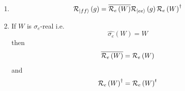 \begin{enumerate}
\begin{enumerate}
\item Bases transformation $W\in GL\left( {\cal H}^{1}\right) $ of ${\cal H}%
^{1}$ produce transformations ${\cal R}_{f}\left( A\right) $ of the
representation ${\cal R}_{e}\left( A\right) $ i.e. 
\begin{equation}
A=\left\vert W\left( \QTR{bs}{e}\right) \right\rangle \left\langle W\left( 
\QTR{bs}{e}\right) \right\vert {\cal R}_{f}\left( A\right) =\left\vert
W\left( \QTR{bs}{e}\right) \right\rangle {\cal R}_{f}\left( A\right)
\left\langle W\left( \QTR{bs}{e}\right) \right\vert =\left\vert \QTR{bs}{e}%
\right\rangle {\cal R}_{e}\left( W\right) {\cal R}_{f}\left( A\right) {\cal R%
}_{e}\left( W\right) ^{\dagger }\left\langle \QTR{bs}{e}\right\vert
\end{equation}%
hence 
\begin{equation}
{\cal R}_{e}\left( A\right) ={\cal R}_{e}\left( W\right) {\cal R}_{f}\left(
A\right) {\cal R}_{e}\left( W\right) ^{\dagger }.
\end{equation}

\item As $W\in GL\left( {\cal H}^{1}\right) $ 
\[
{\cal R}_{f}\left( A\right) ={\cal R}_{e}\left( W\right) ^{-1}{\cal R}%
_{e}\left( A\right) {\cal R}_{e}\left( W\right) ^{-\dagger }. 
\]

\item If $W\in U\left( {\cal H}^{1}\right) $ 
\[
{\cal R}_{f}\left( A\right) ={\cal R}_{e}\left( W\right) ^{\dagger }{\cal R}%
_{e}\left( A\right) {\cal R}_{e}\left( W\right) . 
\]
\end{enumerate}

\item 
\begin{equation}
{\cal R}_{\left\vert ff\right\rangle }\left( g\right) =\overline{{\cal R}%
_{e}\left( W\right) }{\cal R}_{\left\vert ee\right\rangle }\left( g\right) 
{\cal R}_{e}\left( W\right) ^{\dagger }
\end{equation}

\item If $W$ is $\sigma _{e}$-real i.e. 
\begin{equation}
\widehat{\sigma _{e}}\left( W\right) =W
\end{equation}%
then%
\begin{equation}
\overline{{\cal R}_{e}\left( W\right) }={\cal R}_{e}\left( W\right)
\end{equation}
and 
\begin{equation}
{\cal R}_{e}\left( W\right) ^{\dagger }={\cal R}_{e}\left( W\right) ^{t}
\end{equation}
\end{enumerate}

